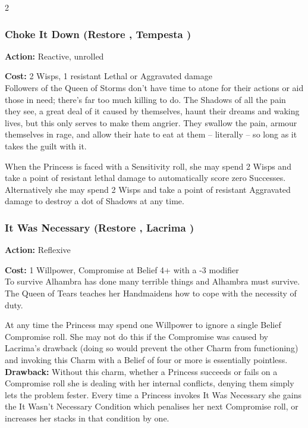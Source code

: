 \begin{multicols}{2}
\subsubsection*{Choke It Down (Restore \textbullet\textbullet\textbullet, Tempesta \textbullet\textbullet)}

\noindent \textbf{Action:} Reactive, unrolled

\noindent \textbf{Cost:} 2 Wisps, 1 resistant Lethal or Aggravated damage \\

\noindent Followers of the Queen of Storms don't have time to atone for their actions or aid those in need; there's far too much killing to do. The Shadows of all the pain they see, a great deal of it caused by themselves, haunt their dreams and waking lives, but this only serves to make them angrier. They swallow the pain, armour themselves in rage, and allow their hate to eat at them -- literally -- so long as it takes the guilt with it.

When the Princess is faced with a Sensitivity roll, she may spend 2 Wisps and take a point of resistant lethal damage to automatically score zero Successes. Alternatively she may spend 2 Wisps and take a point of resistant Aggravated damage to destroy a dot of Shadows at any time.

\subsubsection*{It Was Necessary (Restore \textbullet\textbullet\textbullet, Lacrima \textbullet\textbullet\textbullet\textbullet)}

\noindent \textbf{Action:} Reflexive

\noindent \textbf{Cost:} 1 Willpower, Compromise at Belief 4+ with a -3 modifier\\

\noindent To survive Alhambra has done many terrible things and Alhambra must survive. The Queen of Tears teaches her Handmaidens how to cope with the necessity of duty. 

At any time the Princess may spend one Willpower to ignore a single Belief Compromise roll. She may not do this if the Compromise was caused by Lacrima's drawback (doing so would prevent the other Charm from functioning) and invoking this Charm with a Belief of four or more is essentially pointless.\\

\noindent \textbf{Drawback:} Without this charm, whether a Princess succeeds or fails on a Compromise roll she is dealing with her internal conflicts, denying them simply lets the problem fester. Every time a Princess invokes It Was Necessary she gains the It Wasn't Necessary Condition which penalises her next Compromise roll, or increases her stacks in that condition by one. 


\end{multicols}
